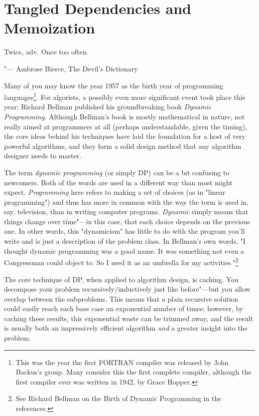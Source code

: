 \chapter{Tangled Dependencies and Memoization}
\label{chap:memoization}
\epigraph{Twice, adv. Once too often.}{"--- Ambrose Bierce, The Devil's Dictionary}

Many of you may know the year 1957 as the birth year of programming languages\footnote{This was the year the first FORTRAN compiler was released by John Backus's group. Many consider this the first complete compiler, although the first compiler ever was written in 1942, by Grace Hopper.
}. For algorists, a possibly even more significant event took place this year: Richard Bellman published his groundbreaking book \textit{Dynamic Programming}. Although Bellman's book is mostly mathematical in nature, not really aimed at programmers at all (perhaps understandable, given the timing), the core ideas behind his techniques have laid the foundation for a host of very powerful algorithms, and they form a solid design method that any algorithm designer needs to master.

The term \textit{dynamic programming} (or simply DP) can be a bit confusing to newcomers. Both of the words are used in a different way than most might expect. \textit{Programming} here refers to making a set of choices (as in "linear programming") and thus has more in common with the way the term is used in, say, television, than in writing computer programs. \textit{Dynamic} simply means that things change over time"---in this case, that each choice depends on the previous one. In other words, this "dynamicism" has little to do with the program you'll write and is just a description of the problem class. In Bellman's own words, "I thought dynamic programming was a good name. It was something not even a Congressman could object to. So I used it as an umbrella for my activities."\footnote{See Richard Bellman on the Birth of Dynamic Programming in the references.}

The core technique of DP, when applied to algorithm design, is caching. You decompose your problem recursively/inductively just like before"---but you allow overlap between the subproblems. This means that a plain recursive solution could easily reach each base case an exponential number of times; however, by caching these results, this exponential waste can be trimmed away, and the result is usually both an impressively efficient algorithm \textit{and} a greater insight into the problem.


